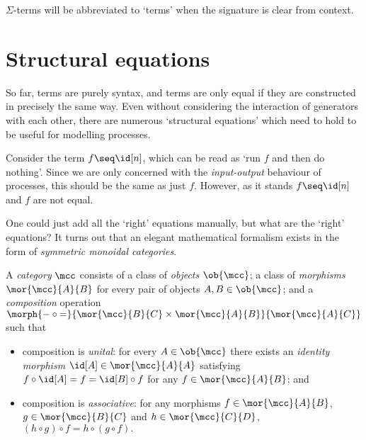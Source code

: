 \(\Sigma\)-terms will be abbreviated to `terms' when the signature is clear from
context.

\section{Structural equations}

So far, terms are purely syntax, and terms are only equal if they are
constructed in precisely the same way.
Even without considering the interaction of generators with each other, there
are numerous `structural equations' which need to hold to be useful for
modelling processes.

\begin{example}
    Consider the term \(f \seq \id[n]\), which can be read as `run \(f\) and
    then do nothing'.
    Since we are only concerned with the \emph{input-output} behaviour of
    processes, this should be the same as just \(f\).
    However, as it stands \(f \seq \id[n]\) and \(f\) are not equal.
\end{example}

One could just add all the `right' equations manually, but what are the `right'
equations?
It turns out that an elegant mathematical formalism exists in the form of
\emph{symmetric monoidal categories}.

\begin{definition}[Categories]
    \label{def:category}
    A \emph{category} \(\mcc\) consists of a class of \emph{objects}
    \(\ob{\mcc}\); a class of \emph{morphisms} \(\mor{\mcc}{A}{B}\)
    for every pair of objects \(A, B \in \ob{\mcc}\); and a \emph{composition}
    operation \(
        \morph{
            {-} \circ {=}
        }{
            \mor{\mcc}{B}{C} \times \mor{\mcc}{A}{B}
        }{
            \mor{\mcc}{A}{C}
        }
    \) such that
    \begin{itemize}
        \item composition is \emph{unital}: for every \(
                    A \in \ob{\mcc}
                \) there exists an \emph{identity morphism} \(
                    \id[A] \in \mor{\mcc}{A}{A}
                \) satisfying \(
                    f \circ \id[A] = f = \id[B] \circ f
                \) for any \(
                    f \in \mor{\mcc}{A}{B}
                \); and
        \item composition is \emph{associative}: for any morphisms \(
                    f \in \mor{\mcc}{A}{B}
                \), \(
                    g \in \mor{\mcc}{B}{C}
                \) and \(h \in \mor{\mcc}{C}{D}\), \(
                    (h \circ g) \circ f = h \circ (g \circ f).
                \)
    \end{itemize}
\end{definition}

